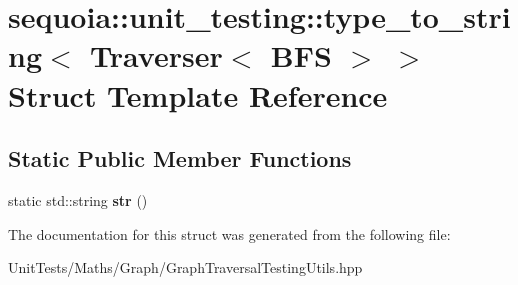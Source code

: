 \hypertarget{structsequoia_1_1unit__testing_1_1type__to__string_3_01_traverser_3_01_b_f_s_01_4_01_4}{}\section{sequoia\+::unit\+\_\+testing\+::type\+\_\+to\+\_\+string$<$ Traverser$<$ B\+FS $>$ $>$ Struct Template Reference}
\label{structsequoia_1_1unit__testing_1_1type__to__string_3_01_traverser_3_01_b_f_s_01_4_01_4}
\subsection*{Static Public Member Functions}
\begin{DoxyCompactItemize}
\item 
\mbox{\label{structsequoia_1_1unit__testing_1_1type__to__string_3_01_traverser_3_01_b_f_s_01_4_01_4_a5819f2f66b7a1cd4203d83642b859eb3}} 
static std\+::string {\bfseries str} ()
\end{DoxyCompactItemize}


The documentation for this struct was generated from the following file\+:\begin{DoxyCompactItemize}
\item 
Unit\+Tests/\+Maths/\+Graph/Graph\+Traversal\+Testing\+Utils.\+hpp\end{DoxyCompactItemize}

